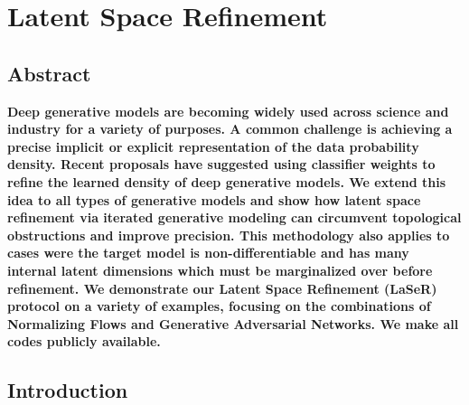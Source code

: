 %
%
%

\chapter{Latent Space Refinement}\label{chap:lsr}
\enlargethispage{2ex}
\vspace*{-2pt}

\enlargethispage{2ex}

\section*{Abstract}
{\bf Deep generative models are becoming widely used across science and industry for a variety of purposes. A common challenge is achieving a precise implicit or explicit representation of the data probability density.  Recent proposals have suggested using classifier weights to refine the learned density of deep generative models.  We extend this idea to all types of generative models and show how latent space refinement via iterated generative modeling can circumvent topological obstructions and improve precision. This methodology also applies to cases were the target model is non-differentiable and has many internal latent dimensions which must be marginalized over before refinement. We demonstrate our Latent Space Refinement (LaSeR) protocol on a variety of examples, focusing on the combinations of Normalizing Flows and Generative Adversarial Networks. We make all codes publicly available.}

\section{Introduction}
\label{sec:lsrintro}

